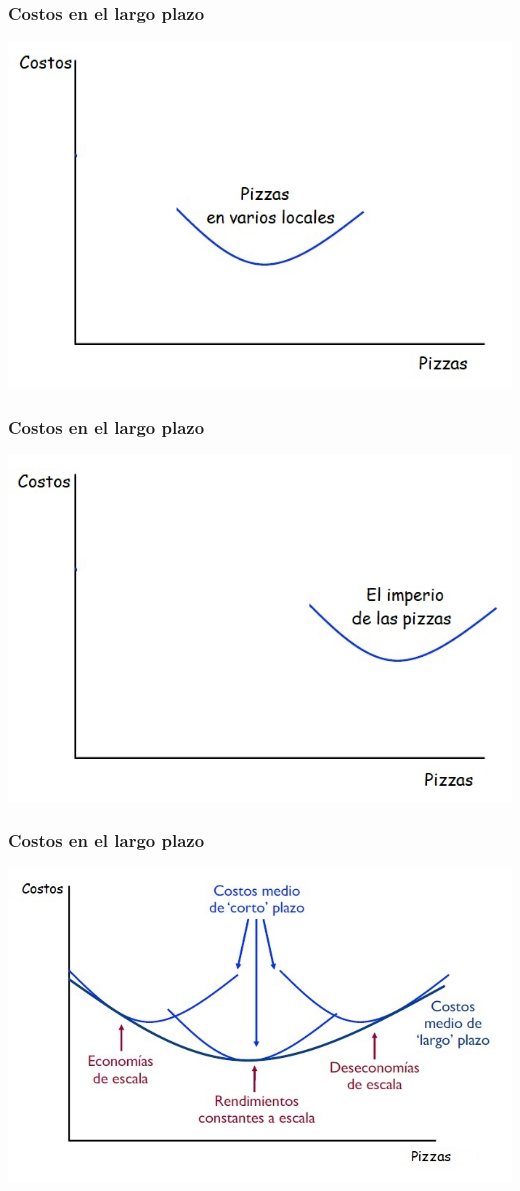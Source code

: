 \documentclass{beamer}
\begin{document}
\begin{frame}
\frametitle{Costos en el largo plazo}
\centering
\includegraphics[scale=0.6]{Slides Principios de Economia/Figures/Tema_06.25.jpg}
\end{frame}

\begin{frame}
\frametitle{Costos en el largo plazo}
\centering
\includegraphics[scale=0.6]{Slides Principios de Economia/Figures/Tema_06.26.jpg}
\end{frame}

\begin{frame}
\frametitle{Costos en el largo plazo}
\centering
\includegraphics[scale=0.6]{Slides Principios de Economia/Figures/Tema_06.25_costos4.jpg}
\end{frame}
\end{document}
